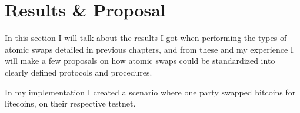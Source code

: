 \chapter{Results \& Proposal}
In this section I will talk about the results I got when performing the types of atomic swaps detailed in previous chapters, and from these and my experience I will make a few proposals on how atomic swaps could  be standardized into clearly defined protocols and procedures. 

In my implementation I created a scenario where one party swapped bitcoins for litecoins, on their respective testnet. 